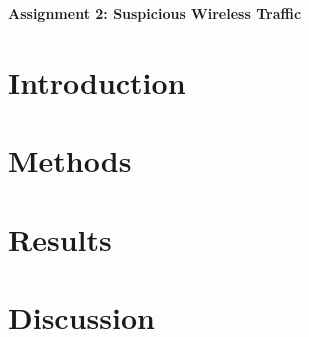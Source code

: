\centerline{\LARGE{\textbf{Assignment 2: Suspicious Wireless Traffic}}}
\section{Introduction}
\blindtext
\section{Methods}
\section{Results}
\section{Discussion}